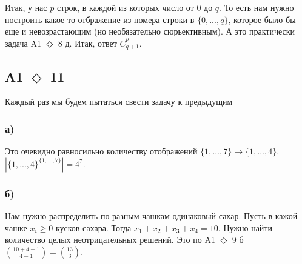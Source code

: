\documentclass[a4paper]{article}
\begin{document}
  Итак, у нас $p$ строк, в каждой из которых число от $0$ до $q$. То есть нам нужно построить какое-то отбражение из номера строки в $\{0, ..., q\}$, которое было бы еще и невозрастающим (но необязательно сюрьективным). А это практически задача A1 $\Diamond$ 8 д. Итак, ответ $\overline{C}^p_{q + 1}$.

  \subsection*{A1 $\Diamond$ 11}
  Каждый раз мы будем пытаться свести задачу к предыдущим
  \subsubsection*{а)}
  Это очевидно равносильно количеству отображений $\{1,...,7\}\to\{1,...,4\}$.\\ $\left|\{1,...,4\}^{\{1,...,7\}}\right| = 4^7$.
  \subsubsection*{б)}
  Нам нужно распределить по разным чашкам одинаковый сахар. Пусть в кажой чашке $x_i \ge 0$ кусков сахара. Тогда $x_1 + x_2 + x_3 + x_4 = 10$. Нужно найти количество целых неотрицательных решений. Это по A1 $\Diamond$ 9 б $\binom{10 + 4 - 1}{4 - 1} = \binom{13}{3}$.
\end{document}

